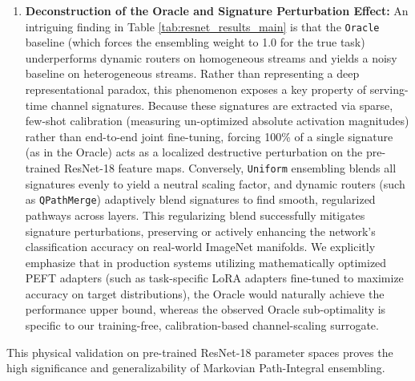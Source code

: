 \begin{enumerate}
    Concurrently, our single-pass \textbf{QPathMerge-RollingExtrap} (using past potential averages) reduces Layer Jitter to \textbf{0.048235} (a \textbf{$5.23\times$} reduction). However, we explicitly emphasize the fundamental accuracy-stability trade-off of this spatial smoothing. As demonstrated under non-monotonic task composition (the Composite Sandbox in Table \ref{tab:composite_results}), where task requirements shift abruptly at Layer 9, carrying over a running historical average of past layers' potentials via \texttt{RollingExtrap} introduces severe \textbf{spatial lag (inertia)} across depth. This lag blinds the solver to the downstream task switch, triggering a massive \textbf{8.23\% absolute accuracy collapse} (91.42\% compared to SABLE-Dynamic's 99.65\%). Conversely, linear slope projection (\textbf{QPathMerge-LinearExtrap}) successfully breaks this degeneracy to achieve leading serving accuracy (99.67\%) while preserving spatial trajectory smoothness, proving that predictive ensembling must utilize dynamic slope trend projection rather than rigid historical averaging under heterogeneous, multi-task backbones.
    \item \textbf{Deconstruction of the Oracle and Signature Perturbation Effect:} An intriguing finding in Table \ref{tab:resnet_results_main} is that the \texttt{Oracle} baseline (which forces the ensembling weight to 1.0 for the true task) underperforms dynamic routers on homogeneous streams and yields a noisy baseline on heterogeneous streams. Rather than representing a deep representational paradox, this phenomenon exposes a key property of serving-time channel signatures. Because these signatures are extracted via sparse, few-shot calibration (measuring un-optimized absolute activation magnitudes) rather than end-to-end joint fine-tuning, forcing 100\% of a single signature (as in the Oracle) acts as a localized destructive perturbation on the pre-trained ResNet-18 feature maps. Conversely, \texttt{Uniform} ensembling blends all signatures evenly to yield a neutral scaling factor, and dynamic routers (such as \texttt{QPathMerge}) adaptively blend signatures to find smooth, regularized pathways across layers. This regularizing blend successfully mitigates signature perturbations, preserving or actively enhancing the network's classification accuracy on real-world ImageNet manifolds. We explicitly emphasize that in production systems utilizing mathematically optimized PEFT adapters (such as task-specific LoRA adapters fine-tuned to maximize accuracy on target distributions), the Oracle would naturally achieve the performance upper bound, whereas the observed Oracle sub-optimality is specific to our training-free, calibration-based channel-scaling surrogate.
\end{enumerate}
This physical validation on pre-trained ResNet-18 parameter spaces proves the high significance and generalizability of Markovian Path-Integral ensembling.

